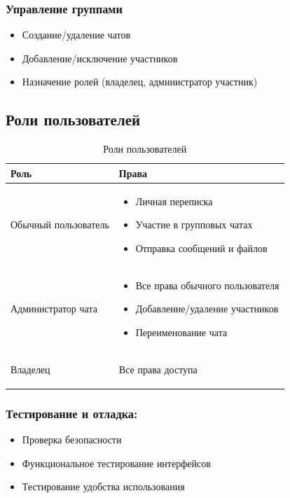 \subsubsection{Управление группами}
\begin{itemize}
	\item Создание/удаление чатов
	\item Добавление/исключение участников
	\item Назначение ролей (владелец, администратор участник)
\end{itemize}

\subsection{Роли пользователей}

\begin{xltabular}{\textwidth}{|l|X|}
	\caption{Роли пользователей}\label{tab:roles} \\ \hline
	\centrow Роль & \centrow Права \\ \hline
	\endfirsthead
	Обычный пользователь & 
	\begin{itemize}
		\item Личная переписка
		\item Участие в групповых чатах
		\item Отправка сообщений и файлов
	\end{itemize} \\ \hline
	Администратор чата & 
	\begin{itemize}
		\item Все права обычного пользователя
		\item Добавление/удаление участников
		\item Переименование чата
	\end{itemize} \\ \hline
	Владелец &
	\begin{itemize}
		Все права доступа
	\end{itemize} \\ \hline
\end{xltabular}

\subsubsection {Тестирование и отладка:}
\begin{itemize}
    \item Проверка безопасности
	\item Функциональное тестирование интерфейсов
	\item Тестирование удобства использования
\end{itemize}
\newpage
